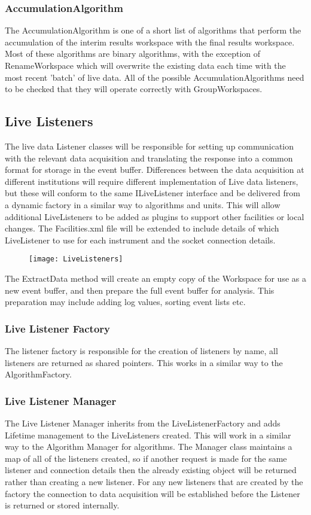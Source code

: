 \subsubsection{AccumulationAlgorithm}
The AccumulationAlgorithm is one of a short list of algorithms that perform the accumulation of the interim results workspace with the final results workspace.  Most of these algorithms are binary algorithms, with the exception of RenameWorkspace which will overwrite the existing data each time with the most recent 'batch' of live data.  All of the possible AccumulationAlgorithms need to be checked that they will operate correctly with GroupWorkspaces.

\subsection{Live Listeners}
The live data Listener classes will be responsible for setting up communication with the relevant data acquisition and translating the response into a common format for storage in the event buffer.  Differences between the data acquisition at different institutions will require different implementation of Live data listeners, but these will conform to the same ILiveListener interface and be delivered from a dynamic factory in a similar way to algorithms and units.  This will allow additional LiveListeners to be added as plugins to support other facilities or local changes.  The Facilities.xml file will be extended to include details of which LiveListener to use for each instrument and the socket connection details.

\begin{figure}[h!]
\centering
\texttt{[image: LiveListeners]}
\end{figure}

The ExtractData method will create an empty copy of the Workspace for use as a new event buffer, and then prepare the full event buffer for analysis.  This preparation may include adding log values, sorting event lists etc.

\subsubsection{Live Listener Factory} 
The listener factory is responsible for the creation of listeners by name, all listeners are returned as shared pointers.  This works in a similar way to the AlgorithmFactory.

\subsubsection{Live Listener Manager}
The Live Listener Manager inherits from the LiveListenerFactory and adds Lifetime management to the LiveListeners created.  This will work in a similar way to the Algorithm Manager for algorithms.  The Manager class maintains a map of all of the listeners created, so if another request is made for the same listener and connection details then the already existing object will be returned rather than creating a new listener.  For any new listeners that are created by the factory the connection to data acquisition will be established before the Listener is returned or stored internally.


